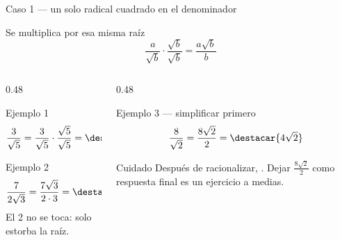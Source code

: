 \documentclass[aspectratio=169,10pt]{beamer}
\begin{document}
\begin{frame}{Caso 1 — un solo radical cuadrado en el denominador}
  \scriptsize
  \begin{block}{Se multiplica por esa misma raíz}
    \tiny
    \[ \frac{a}{\sqrt{b}}\cdot\frac{\sqrt{b}}{\sqrt{b}}
       = \frac{a\sqrt{b}}{b} \]
  \end{block}

  \vspace{0.08cm}
  \begin{columns}[T,onlytextwidth]
    \begin{column}{0.48\textwidth}
      \begin{exampleblock}{Ejemplo 1}
        \tiny
        \[ \frac{3}{\sqrt{5}} = \frac{3}{\sqrt5}\cdot\frac{\sqrt5}{\sqrt5}
           = \destacar{\frac{3\sqrt{5}}{5}} \]
      \end{exampleblock}
      \begin{exampleblock}{Ejemplo 2}
        \tiny
        \[ \frac{7}{2\sqrt{3}} = \frac{7\sqrt3}{2\cdot 3}
           = \destacar{\frac{7\sqrt{3}}{6}} \]
        {\color{uniGris} El 2 no se toca: solo estorba la raíz.}
      \end{exampleblock}
    \end{column}
    \begin{column}{0.48\textwidth}
      \begin{exampleblock}{Ejemplo 3 — simplificar primero}
        \tiny
        \[ \frac{8}{\sqrt{2}} = \frac{8\sqrt2}{2} = \destacar{4\sqrt{2}} \]
      \end{exampleblock}
      \begin{alertblock}{Cuidado}
        \tiny
        Después de racionalizar, .
        Dejar $\tfrac{8\sqrt2}{2}$ como respuesta final es un ejercicio a
        medias.
      \end{alertblock}
    \end{column}
  \end{columns}
\end{frame}
\end{document}

